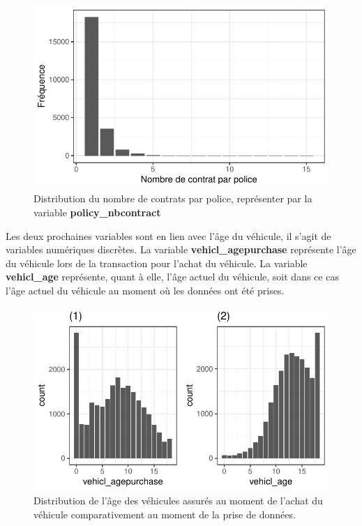 \documentclass[
]{article}
\begin{document}
\begin{figure}

{\centering \includegraphics{01-Rapport_files/figure-latex/graph_policy_nbcontract-1} 

}

\caption{\label{fig:policyNbcontract}Distribution du nombre de contrats par police, représenter par la variable \textbf{policy\_nbcontract}}\label{fig:graph_policy_nbcontract}
\end{figure}

Les deux prochaines variables sont en lien avec l'âge du véhicule, il
s'agit de variables numériques discrètes. La variable
\textbf{vehicl\_agepurchase} représente l'âge du véhicule lors de la
transaction pour l'achat du véhicule. La variable \textbf{vehicl\_age}
représente, quant à elle, l'âge actuel du véhicule, soit dans ce cas
l'âge actuel du véhicule au moment où les données ont été prises.

\begin{figure}

{\centering \includegraphics{01-Rapport_files/figure-latex/graph_age-1} 

}

\caption{\label{fig:}Distribution de l'âge des véhicules assurés au moment de l'achat du véhicule comparativement au moment de la prise de données.}\label{fig:graph_age}
\end{figure}
\end{document}
